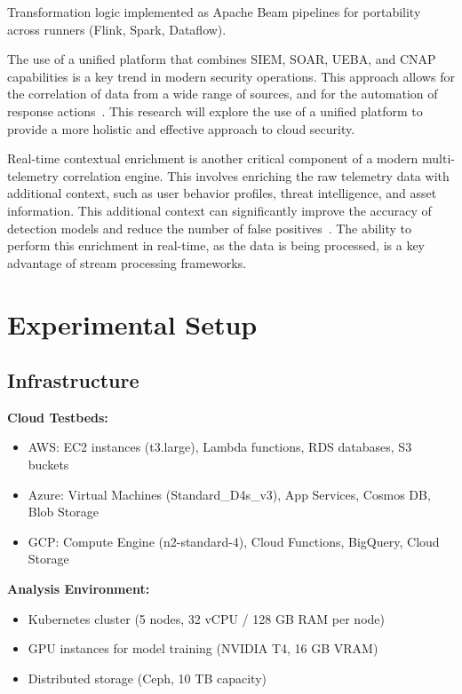 Transformation logic implemented as Apache Beam pipelines for portability across runners (Flink, Spark, Dataflow).

The use of a unified platform that combines SIEM, SOAR, UEBA, and CNAP capabilities is a key trend in modern security operations. This approach allows for the correlation of data from a wide range of sources, and for the automation of response actions~\cite{securityboulevard2024unified}. This research will explore the use of a unified platform to provide a more holistic and effective approach to cloud security.

Real-time contextual enrichment is another critical component of a modern multi-telemetry correlation engine. This involves enriching the raw telemetry data with additional context, such as user behavior profiles, threat intelligence, and asset information. This additional context can significantly improve the accuracy of detection models and reduce the number of false positives~\cite{msspalert2024enrichment}. The ability to perform this enrichment in real-time, as the data is being processed, is a key advantage of stream processing frameworks.

\section{Experimental Setup}\label{sec:method-experimental}
\subsection{Infrastructure}
\textbf{Cloud Testbeds:}
\begin{itemize}
    \item AWS: EC2 instances (t3.large), Lambda functions, RDS databases, S3 buckets
    \item Azure: Virtual Machines (Standard\_D4s\_v3), App Services, Cosmos DB, Blob Storage
    \item GCP: Compute Engine (n2-standard-4), Cloud Functions, BigQuery, Cloud Storage
\end{itemize}

\textbf{Analysis Environment:}
\begin{itemize}
    \item Kubernetes cluster (5 nodes, 32 vCPU / 128 GB RAM per node)
    \item GPU instances for model training (NVIDIA T4, 16 GB VRAM)
    \item Distributed storage (Ceph, 10 TB capacity)
\end{itemize}

